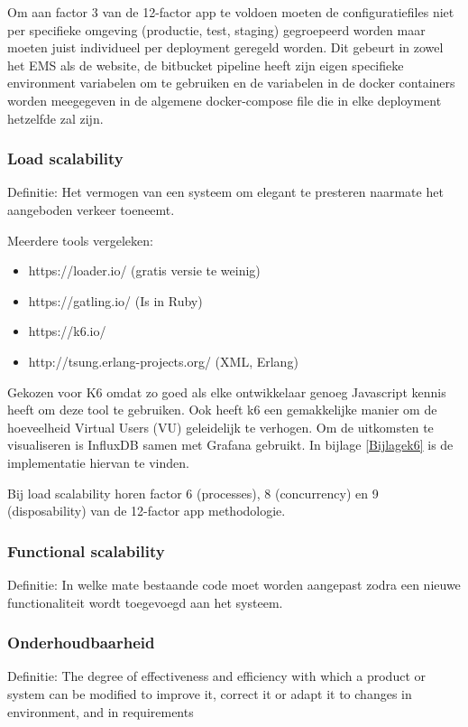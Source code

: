 Om aan factor 3 van de 12-factor app te voldoen moeten de configuratiefiles niet per specifieke omgeving (productie, test, staging) gegroepeerd worden maar moeten juist individueel per deployment geregeld worden. Dit gebeurt in zowel het EMS als de website, de bitbucket pipeline heeft zijn eigen specifieke environment variabelen om te gebruiken en de variabelen in de docker containers worden meegegeven in de algemene docker-compose file die in elke deployment hetzelfde zal zijn.

\subsubsection{Load scalability}
Definitie: Het vermogen van een systeem om elegant te presteren naarmate het aangeboden verkeer toeneemt.

Meerdere tools vergeleken:
\begin{itemize}
	\item https://loader.io/ (gratis versie te weinig)
	\item https://gatling.io/ (Is in Ruby)
	\item https://k6.io/
	\item http://tsung.erlang-projects.org/ (XML, Erlang)
\end{itemize}

Gekozen voor K6 omdat zo goed als elke ontwikkelaar genoeg Javascript kennis heeft om deze tool te gebruiken. Ook heeft k6 een gemakkelijke manier om de hoeveelheid Virtual Users (VU) geleidelijk te verhogen. Om de uitkomsten te visualiseren is InfluxDB samen met Grafana gebruikt. In bijlage \ref{Bijlagek6} is de implementatie hiervan te vinden.

Bij load scalability horen factor 6 (processes), 8 (concurrency) en 9 (disposability) van de 12-factor app methodologie.

\subsubsection{Functional scalability}
Definitie: In welke mate bestaande code moet worden aangepast zodra een nieuwe functionaliteit wordt toegevoegd aan het systeem.

\subsubsection{Onderhoudbaarheid}
Definitie: The degree of effectiveness and efficiency with which a product or system can be modified to improve it, correct it or adapt it to changes in environment, and in requirements


